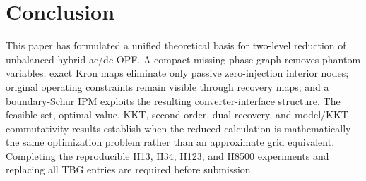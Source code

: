 \documentclass[journal,10pt]{IEEEtran}
\begin{document}
\section{Conclusion}
This paper has formulated a unified theoretical basis for two-level reduction
of unbalanced hybrid ac/dc OPF.  A compact missing-phase graph removes phantom
variables; exact Kron maps eliminate only passive zero-injection interior
nodes; original operating constraints remain visible through recovery maps;
and a boundary-Schur IPM exploits the resulting converter-interface structure.
The feasible-set, optimal-value, KKT, second-order, dual-recovery, and
model/KKT-commutativity results establish when the reduced calculation is
mathematically the same optimization problem rather than an approximate grid
equivalent.  Completing the reproducible H13, H34, H123, and H8500 experiments
and replacing all TBG entries are required before submission.



\end{document}
